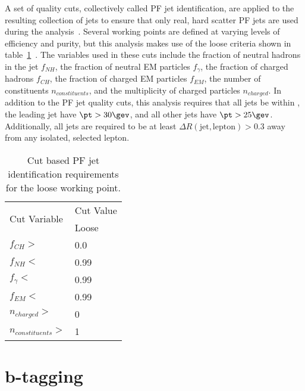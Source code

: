 A set of quality cuts, collectively called PF jet identification, are applied to the resulting collection of jets to ensure that only real, hard scatter PF jets are used during the analysis~\cite{CMS-AN-2010-003}. Several working points are defined at varying levels of efficiency and purity, but this analysis makes use of the loose criteria shown in table~\ref{tab:PFJetID}~\cite{PFJetID}. The variables used in these cuts include the fraction of neutral hadrons in the jet $f_{NH}$, the fraction of neutral EM particles $f_{\gamma}$, the fraction of charged hadrons $f_{CH}$, the fraction of charged EM particles $f_{EM}$, the number of constituents $n_{constituents}$, and the multiplicity of charged particles $n_{charged}$. In addition to the PF jet quality cuts, this analysis requires that all jets be within , the leading jet have $\pt>30\gev$, and all other jets have $\pt>25\gev$. Additionally, all jets are required to be at least ${\Delta}R(\textrm{jet},\textrm{lepton})>0.3$ away from any isolated, selected lepton.
\begin{table}[htbp]
    \caption{Cut based PF jet identification requirements for the loose working point.}
    \centering
    \begin{tabular}{ll}
        \hline
        \multirow{2}{*}{Cut Variable}               & Cut Value \\\cline{2-2}
                                                    & Loose \\
        \hline
        $f_{CH}>$                                  & 0.0        \\
        $f_{NH}<$                                  & 0.99 \\
        $f_{\gamma}<$                              & 0.99        \\
        $f_{EM}<$                                  & 0.99         \\
        $n_{charged}>$                              & 0          \\
        $n_{constituents}>$                         & 1           \\
        \hline
    \end{tabular}
    \label{tab:PFJetID}
\end{table}

\section{b-tagging}
\label{sec:btagging}

